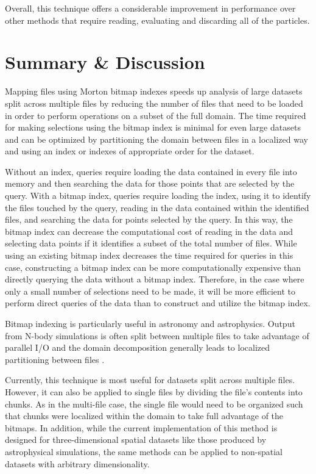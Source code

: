 \documentclass[apjl]{emulateapj}
\newcommand{\todo}[1]{{\color{red}{#1}}}
\begin{document}
Overall, this technique offers a considerable improvement in performance over other methods that require reading, evaluating and discarding all of the particles.

\section{Summary \& Discussion}\label{S:discuss}
Mapping files using Morton bitmap indexes speeds up analysis of large datasets split across multiple files by reducing the number of files that need to be loaded in order to perform operations on a subset of the full domain. The time required for making selections using the bitmap index is minimal for even large datasets and can be optimized by partitioning the domain between files in a localized way and using an index or indexes of appropriate order for the dataset. 

Without an index, queries require loading the data contained in every file into memory and then searching the data for those points that are selected by the query. With a bitmap index, queries require loading the index, using it to identify the files touched by the query, reading in the data contained within the identified files, and searching the data for points selected by the query. In this way, the bitmap index can decrease the computational cost of reading in the data and selecting data points if it identifies a subset of the total number of files. While using an existing bitmap index decreases the time required for queries in this case, constructing a bitmap index can be more computationally expensive than directly querying the data without a bitmap index. Therefore, in the case where only a small number of selections need to be made, it will be more efficient to perform direct queries of the data than to construct and utilize the bitmap index.

Bitmap indexing is particularly useful in astronomy and astrophysics. Output from N-body simulations is often split between multiple files to take advantage of parallel I/O and the domain decomposition generally leads to localized partitioning between files \citep{Springel2001,Springel2005b,Hopkins2015}. %

Currently, this technique is most useful for datasets split across multiple files. However, it can also be applied to single files by dividing the file's contents into chunks. As in the multi-file case, the single file would need to be organized such that chunks were localized within the domain to take full advantage of the bitmaps. In addition, while the current implementation of this method is designed for three-dimensional spatial datasets like those produced by astrophysical simulations, the same methods can be applied to non-spatial datasets with arbitrary dimensionality.
\end{document}
